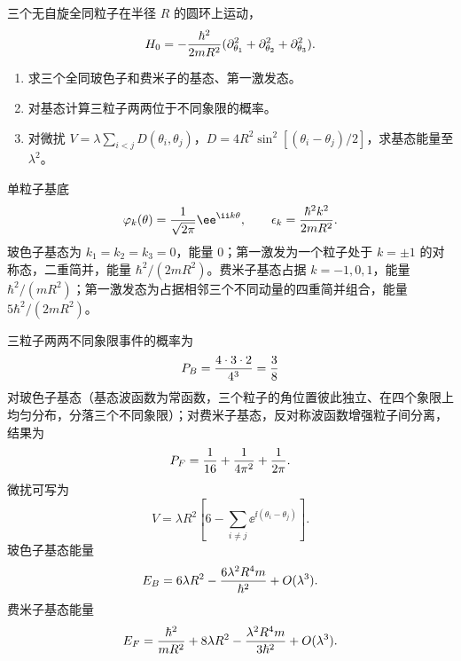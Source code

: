\begin{question}
三个无自旋全同粒子在半径 $R$ 的圆环上运动，
\[
  H_0=-{\hbar^2\over2mR^2}(\partial_{\theta_1}^2+\partial_{\theta_2}^2+\partial_{\theta_3}^2).
\]
\begin{enumerate}
  \item 求三个全同玻色子和费米子的基态、第一激发态。
  \item 对基态计算三粒子两两位于不同象限的概率。
  \item 对微扰 $V=\lambda\sum_{i<j}D(\theta_i,\theta_j)$，$D=4R^2\sin^2[(\theta_i-\theta_j)/2]$，求基态能量至 $\lambda^2$。
\end{enumerate}
\begin{solution}
单粒子基底
\[
  \varphi_k(\theta)={1\over\sqrt{2\pi}}\ee^{\ii k\theta},\qquad
  \epsilon_k={\hbar^2k^2\over2mR^2}.
\]
玻色子基态为 $k_1=k_2=k_3=0$，能量 $0$；第一激发为一个粒子处于 $k=\pm1$ 的对称态，二重简并，能量 $\hbar^2/(2mR^2)$。费米子基态占据 $k=-1,0,1$，能量 $\hbar^2/(mR^2)$；第一激发态为占据相邻三个不同动量的四重简并组合，能量 $5\hbar^2/(2mR^2)$。

三粒子两两不同象限事件的概率为
\[
  P_B={4\cdot3\cdot2\over4^3}={3\over8}
\]
对玻色子基态（基态波函数为常函数，三个粒子的角位置彼此独立、在四个象限上均匀分布，分落三个不同象限）；对费米子基态，反对称波函数增强粒子间分离，结果为
\[
  P_F={1\over16}+{1\over4\pi^2}+{1\over2\pi}.
\]
微扰可写为
\[
  V=\lambda R^2\left[6-\sum_{i\ne j}\ee^{\ii(\theta_i-\theta_j)}\right].
\]
玻色子基态能量
\[
  E_B=6\lambda R^2-{6\lambda^2R^4m\over\hbar^2}+O(\lambda^3).
\]
费米子基态能量
\[
  E_F={\hbar^2\over mR^2}+8\lambda R^2-{\lambda^2R^4m\over3\hbar^2}+O(\lambda^3).
\]
\end{solution}
\end{question}

